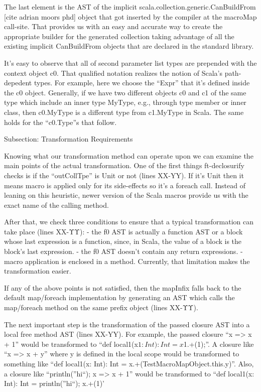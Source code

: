The last element is the AST of the implicit
scala.collection.generic.CanBuildFrom [cite adrian moors phd] object that got
inserted by the compiler at the macroMap call-site. That provides us with an
easy and accurate way to create the appropriate builder for the generated
collection taking advantage of all the existing implicit CanBuildFrom objects
that are declared in the standard library.

It's easy to observe that all of second parameter list types are prepended
with the context object c0. That qualified notation realizes the notion of
Scala's path-depedent types. For example, here we choose the ``Expr'' that it's
defined inside the c0 object. Generally, if we have two different objects c0 and
c1 of the same type which include an inner type MyType, e.g., through type
member or inner class,  then c0.MyType is a different type from c1.MyType in
Scala. The same holds for the ``c0.Type''s that follow.


Subsection: Transformation Requirements

Knowing what our transformation method can operate upon we can examine the
main points of the actual transformation. One of the first things ft-declosurify
checks is if the ``outCollTpe'' is Unit or not (lines XX-YY). If it's Unit then
it means
macro is applied only for its side-effects so it's a foreach call. Instead of
leaning on this heuristic, newer version of the Scala macros provide us with the
exact name of the calling method.

After that, we check three conditions to ensure that a typical
transformation can take place (lines XX-ΥΥ):
- the f0 AST is actually a function AST or a block whose last
expression is a function, since, in Scala, the value of a block is the block's
last expression.
- the f0 AST doesn't contain any return expressions.
- macro application is enclosed in a method. Currently, that limitation makes
the transformation easier.

If any of the above points is not satisfied, then the mapInfix falls back to the
default map/foreach implementation by generating an AST which
calls the map/foreach method on the same prefix object (lines XX-ΥΥ).

The next important step is the transformation of the passed closure AST
into a local free method AST (lines XX-YY). For example, the passed closure ``x
=> x + 1'' would be transformed to ``def local1(x$1: Int): Int = x$1.+(1);''. A
closure like ``x => x + y'' where y is defined in the local scope would be
transformed to something like ``def local1(x: Int): Int =
x.+(TestMacroMapObject.this.y)''. Also, a closure like ``{println(''hi``); x =>
x + 1}'' would be transformed to ``def local1(x: Int): Int = {println(''hi``);
x.+(1)}'

